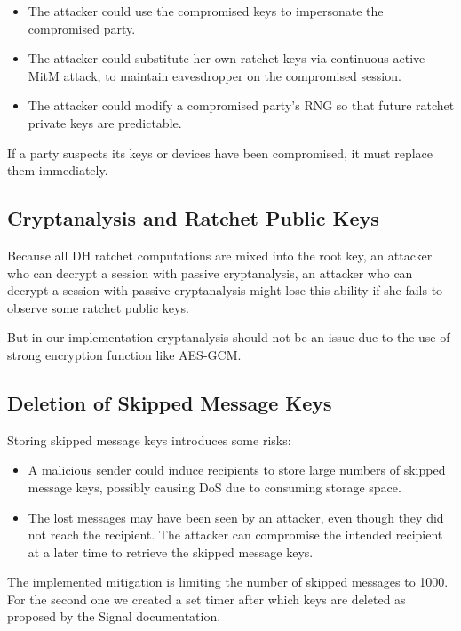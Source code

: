 \begin{itemize}
  \item The attacker could use the compromised keys to impersonate the compromised party.
  \item The attacker could substitute her own ratchet keys via continuous active MitM attack, to maintain eavesdropper on the compromised session.
  \item The attacker could modify a compromised party's RNG so that future ratchet private keys are predictable.
\end{itemize}

If a party suspects its keys or devices have been compromised, it must replace them immediately.

\subsection{Cryptanalysis and Ratchet Public Keys}
\label{subsec:CryptanalysisandRatchetPublicKeys}

Because all DH ratchet computations are mixed into the root key, an attacker who can decrypt a session with passive cryptanalysis, an attacker who can decrypt a session with passive cryptanalysis might lose this ability if she fails to observe some ratchet public keys.

But in our implementation cryptanalysis should not be an issue due to the use of strong encryption function like AES-GCM.

\subsection{Deletion of Skipped Message Keys}
\label{subsec:DeletionofSkippedMessageKeys}

Storing skipped message keys introduces some risks:

\begin{itemize}
  \item A malicious sender could induce recipients to store large numbers of skipped message keys, possibly causing DoS due to consuming storage space.
  \item The lost messages may have been seen by an attacker, even though they did not reach the recipient. The attacker can compromise the intended recipient at a later time to retrieve the skipped message keys.
\end{itemize}

The implemented mitigation is limiting the number of skipped messages to 1000. For the second one we created a set timer after which keys are deleted as proposed by the Signal documentation.

